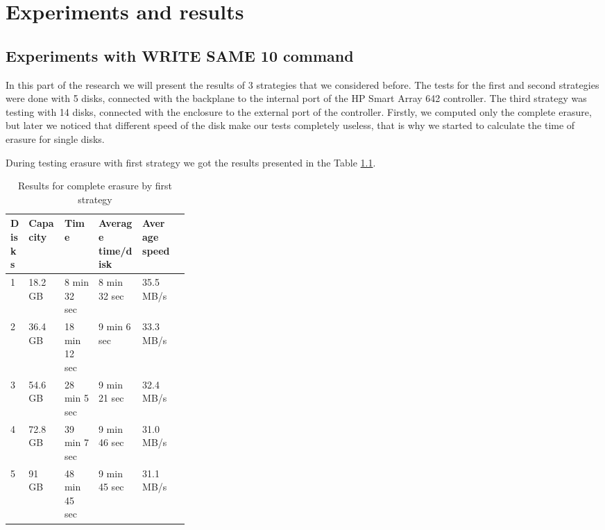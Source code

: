\chapter{Experiments and results}
\label{chap5:title}


\section{Experiments with WRITE SAME 10 command}

In this part of the research we will present the results of 3 strategies that we considered before. The tests for the first and second strategies were done with 5 disks, connected with the backplane to the internal port of the HP Smart Array 642 controller.
The third strategy was testing with 14 disks, connected with the enclosure to the external port of the controller. Firstly, we computed only the complete erasure, but later we noticed that different speed of the disk make our tests completely useless, that is why we started to calculate the time of erasure for single disks. 

\newpage 
During testing erasure with first strategy we got the results presented in the Table \ref{tbl:tbl_logic1}. 


\begin{table}[h!]
  \caption{Results for complete erasure by first strategy}
  \begin{center}
  \begin{tabularx}{\textwidth}{|p{0.1\linewidth}|p{0.2\linewidth}|X|X|X|X|}
    \hline
    Disks & Capacity & Time & Average time/disk & Average speed
    \\ \hline
    1 & 18.2 GB & 8 min 32 sec  & 8 min 32 sec & 35.5 MB/s \\ \hline    
    2 & 36.4 GB & 18 min 12 sec & 9 min 6 sec  & 33.3 MB/s \\ \hline
    3 & 54.6 GB & 28 min 5 sec  & 9 min 21 sec & 32.4 MB/s \\ \hline
    4 & 72.8 GB & 39 min 7 sec  & 9 min 46 sec & 31.0 MB/s \\ \hline
    5 & 91 GB   & 48 min 45 sec & 9 min 45 sec & 31.1 MB/s \\ \hline
  \end{tabularx}
  \label{tbl:tbl_logic1}
  \end{center}
\end{table}

